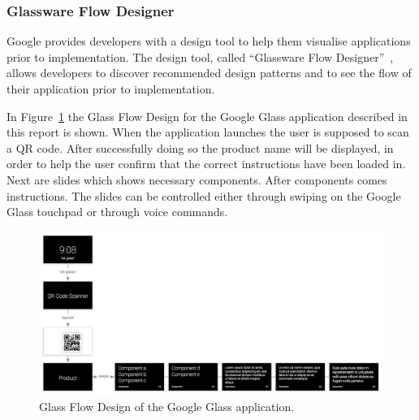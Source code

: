 \subsubsection{Glassware Flow Designer}
Google provides developers with a design tool to help them visualise applications prior to implementation. The design tool, called ``Glassware Flow Designer''~\cite{glasswareFlowDesigner}, allows developers to discover recommended design patterns and to see the flow of their application prior to implementation.

In Figure~\ref{glassFlowDesign} the Glass Flow Design for the Google Glass application described in this report is shown. When the application launches the user is supposed to scan a QR code. After successfully doing so the product name will be displayed, in order to help the user confirm that the correct instructions have been loaded in. Next are slides which shows necessary components. After components comes instructions. The slides can be controlled either through swiping on the Google Glass touchpad or through voice commands.

	\begin{figure}[ht!]
		\centering
		\includegraphics[width=150mm]{images/glaswareFlowDesignerScreenshot}
		\caption{Glass Flow Design of the Google Glass application.}
		\label{glassFlowDesign}
	\end{figure}